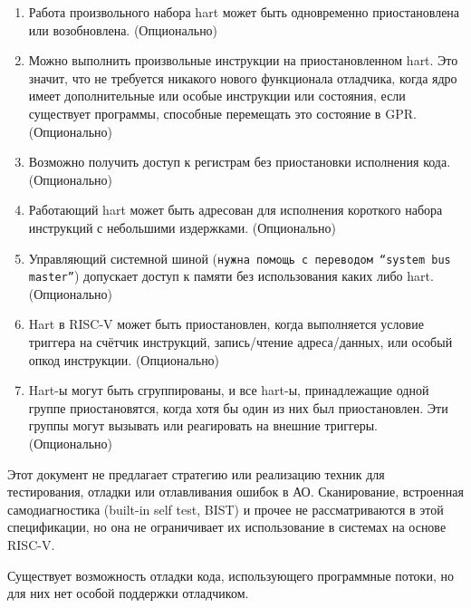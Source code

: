 \begin{enumerate}
   \item Работа произвольного набора hart может быть одновременно приостановлена или
       возобновлена. (Опционально)
   \item Можно выполнить произвольные инструкции на
       приостановленном hart. Это значит, что не требуется никакого нового функционала
       отладчика, когда ядро имеет дополнительные или особые инструкции или состояния,
       если существует программы, способные перемещать это состояние в GPR. (Опционально)
   \item Возможно получить доступ к регистрам без приостановки исполнения кода. (Опционально)
   \item Работающий hart может быть адресован для исполнения короткого набора
       инструкций с небольшими издержками. (Опционально)
   \item Управляющий системной шиной ({\tt нужна помощь с переводом ``system bus master''}) допускает
       доступ к памяти без использования каких либо hart. (Опционально)
   \item Hart в RISC-V может быть приостановлен, когда выполняется условие триггера на
       счётчик инструкций, запись/чтение адреса/данных, или особый опкод инструкции. (Опционально)
    \item Hart-ы могут быть сгруппированы, и все hart-ы, принадлежащие одной группе приостановятся,
        когда хотя бы один из них был приостановлен. Эти группы могут вызывать или реагировать на
        внешние триггеры. (Опционально)
\end{enumerate}

Этот документ не предлагает стратегию или реализацию техник для тестирования, отладки или
отлавливания ошибок в АО. Сканирование, встроенная самодиагностика (built-in self test, BIST) и прочее
не рассматриваются в этой спецификации, но она не ограничивает их использование в системах на основе
RISC-V.

Существует возможность отладки кода, использующего программные потоки, но для них нет
особой поддержки отладчиком.
